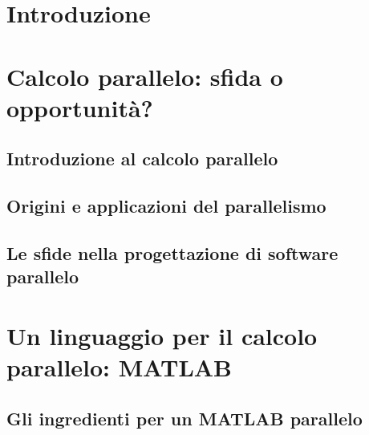 \documentclass[
	a4paper,
	twoside,
	12pt
]{book}
\begin{document}
\frontmatter

\tableofcontents
\mainmatter
\chapter*{Introduzione}
\label{cap:introduzione}

\chapter{Calcolo parallelo: sfida o opportunit\`a?}
\label{cap:calcoloParalleloSfidaOpportunita}

\section{Introduzione al calcolo parallelo}
\label{par:introduzioneCalcoloParallelo}
\nocite{Patterson2022}
\nocite{Silberschatz2014}

\section{Origini e applicazioni del parallelismo}
\label{par:causeParallelismo}
\nocite{Hennessy2019}

\section{Le sfide nella progettazione di software parallelo}
\label{par1.3}

\chapter{Un linguaggio per il calcolo parallelo: MATLAB}
\label{cap:unLinguaggioPerIlCalcoloParalleloMATLAB}

\section{Gli ingredienti per un MATLAB parallelo}
\nocite{Sharma2009}
\label{par:ingredientiMATLABParallelo}

\end{document}
